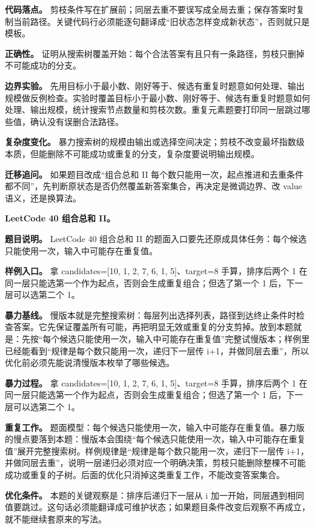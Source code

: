 \textbf{代码落点。} 剪枝条件写在扩展前；同层去重不要误写成全局去重；保存答案时复制当前路径。关键代码行必须能逐句翻译成“旧状态怎样变成新状态”，否则就只是模板。

\textbf{正确性。} 证明从搜索树覆盖开始：每个合法答案有且只有一条路径，剪枝只删掉不可能成功的分支。

\textbf{边界实验。} 先用目标小于最小数、刚好等于、候选有重复时题意如何处理、输出规模做反例检查。实验时覆盖目标小于最小数、刚好等于、候选有重复时题意如何处理、输出规模，统计搜索节点数量和剪枝次数。重复元素题要打印同一层跳过哪些值，确认没有误删合法路径。

\textbf{复杂度变化。} 暴力搜索树的规模由输出或选择空间决定；剪枝不改变最坏指数级本质，但能删除不可能成功或重复的分支，复杂度要说明输出规模。

\textbf{迁移追问。} 如果题目改成“组合总和 II 每个数只能用一次，起点推进和去重条件都不同”，先判断原状态是否仍然覆盖新答案集合，再决定是微调边界、改 value 语义，还是换算法。

\noindent\textbf{LeetCode 40 组合总和 II。}

\textbf{题目说明。} LeetCode 40 组合总和 II 的题面入口要先还原成具体任务：每个候选只能使用一次，输入中可能存在重复值。

\textbf{样例入口。} 拿 candidates=[10, 1, 2, 7, 6, 1, 5]、target=8 手算，排序后两个 1 在同一层只能选第一个作为起点，否则会生成重复组合；但选了第一个 1 后，下一层可以选第二个 1。

\textbf{暴力基线。} 慢版本就是完整搜索树：每层列出选择列表，路径到达终止条件时检查答案。它先保证覆盖所有可能，再把明显无效或重复的分支剪掉。放到本题就是：先按“每个候选只能使用一次，输入中可能存在重复值”完整试慢版本；样例里已经能看到“规律是每个数只能用一次，递归下一层传 i+1，并做同层去重”，所以优化前必须先能说清慢版本枚举了哪些候选。

\textbf{暴力过程。} 拿 candidates=[10, 1, 2, 7, 6, 1, 5]、target=8 手算，排序后两个 1 在同一层只能选第一个作为起点，否则会生成重复组合；但选了第一个 1 后，下一层可以选第二个 1。

\textbf{重复工作。} 题面模型：每个候选只能使用一次，输入中可能存在重复值。暴力版的慢点要落到本题：慢版本会围绕“每个候选只能使用一次，输入中可能存在重复值”展开完整搜索树。样例规律是“规律是每个数只能用一次，递归下一层传 i+1，并做同层去重”，说明一层递归必须对应一个明确决策，剪枝只能删除整棵不可能成功或重复的子树。后面的优化只消掉这类重复工作，不能改变答案集合。

\textbf{优化条件。} 本题的关键观察是：排序后递归下一层从 i 加一开始，同层遇到相同值要跳过。这句话必须能翻译成可维护状态；如果题目条件改变后观察不再成立，就不能继续套原来的写法。

